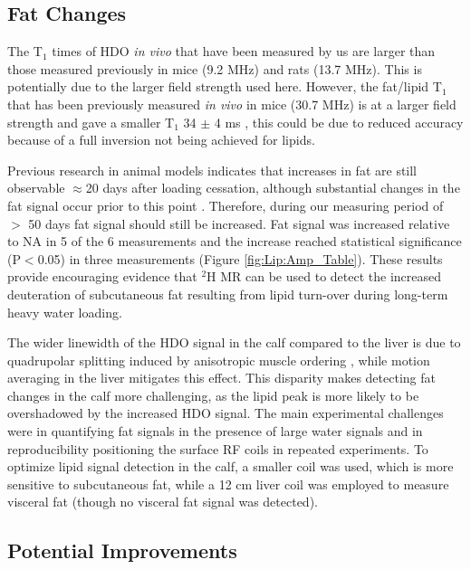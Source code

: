 \subsection{Fat Changes}

The T$_1$ times of \ac{HDO} \textit{in vivo} that have been measured by us are larger than those measured previously in mice \cite{Fung1979StudyWater} (9.2 MHz) and rats \cite{Block1987COMMUNICATIONSTissues} (13.7 MHz). This is potentially due to the larger field strength used here. However, the fat/lipid T$_1$ that has been previously measured \textit{in vivo} in mice (30.7 MHz) is at a larger field strength and gave a smaller T$_1$ 34 $\pm$ 4 ms \cite{Brereton1986PreliminarySpectroscopy}, this could be due to reduced accuracy because of a full inversion not being achieved for lipids. 

Previous research in animal models indicates that increases in fat are still observable $\approx$20 days after loading cessation, although substantial changes in the fat signal occur prior to this point \cite{Brereton1986PreliminarySpectroscopy}. Therefore, during our measuring period of $>$ 50 days fat signal should still be increased. Fat signal was increased relative to \ac{NA} in 5 of the 6 measurements and the increase reached statistical significance (P$<$0.05) in three measurements (Figure \ref{fig:Lip:Amp_Table}). These results provide encouraging evidence that $^2$H MR can be used to detect the increased deuteration of subcutaneous fat resulting from lipid turn-over during long-term heavy water loading. 

The wider linewidth of the \ac{HDO} signal in the calf compared to the liver is due to quadrupolar splitting induced by anisotropic muscle ordering \cite{Gursan2022ResidualMuscle}, while motion averaging in the liver mitigates this effect. This disparity makes detecting fat changes in the calf more challenging, as the lipid peak is more likely to be overshadowed by the increased \ac{HDO} signal. The main experimental challenges were in quantifying fat signals in the presence of large water signals and in reproducibility positioning the surface RF coils in repeated experiments. To optimize lipid signal detection in the calf, a smaller coil was used, which is more sensitive to subcutaneous fat, while a 12 cm liver coil was employed to measure visceral fat (though no visceral fat signal was detected). 

\subsection{Potential Improvements}

